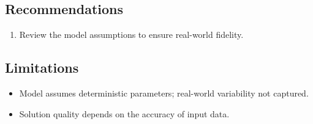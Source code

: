 \documentclass[11pt, a4paper]{article}
\begin{document}


\subsection{Recommendations}

\begin{enumerate}
  \item Review the model assumptions to ensure real-world fidelity.
\end{enumerate}

\subsection{Limitations}

\begin{polyawarnbox}
\begin{itemize}
  \item Model assumes deterministic parameters; real-world variability not captured.
  \item Solution quality depends on the accuracy of input data.
\end{itemize}
\end{polyawarnbox}

\end{document}
